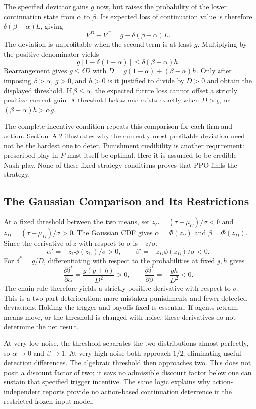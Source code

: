 \documentclass{article}
\begin{document}
The specified deviator gains $g$ now, but raises the probability of the lower continuation state from $\alpha$ to $\beta$. Its expected loss of continuation value is therefore $\delta(\beta-\alpha)L$, giving
\[
V^D-V^C=g-\delta(\beta-\alpha)L.
\]
The deviation is unprofitable when the second term is at least $g$. Multiplying by the positive denominator yields
\[
g[1-\delta(1-\alpha)]\le\delta(\beta-\alpha)h.
\]
Rearrangement gives $g\le\delta D$ with $D=g(1-\alpha)+(\beta-\alpha)h$. Only after imposing $\beta>\alpha$, $g>0$, and $h>0$ is it justified to divide by $D>0$ and obtain the displayed threshold. If $\beta\le\alpha$, the expected future loss cannot offset a strictly positive current gain. A threshold below one exists exactly when $D>g$, or $(\beta-\alpha)h>\alpha g$.

The complete incentive condition repeats this comparison for each firm and action. Section~A.2 illustrates why the currently most profitable deviation need not be the hardest one to deter. Punishment credibility is another requirement: prescribed play in $P$ must itself be optimal. Here it is assumed to be credible Nash play. None of these fixed-strategy conditions proves that PPO finds the strategy.

\subsection{The Gaussian Comparison and Its Restrictions}

At a fixed threshold between the two means, set $z_C=(\tau-\mu_C)/\sigma<0$ and $z_D=(\tau-\mu_D)/\sigma>0$. The Gaussian CDF gives $\alpha=\Phi(z_C)$ and $\beta=\Phi(z_D)$. Since the derivative of $z$ with respect to $\sigma$ is $-z/\sigma$,
\[
\alpha'=-z_C\phi(z_C)/\sigma>0,
\qquad \beta'=-z_D\phi(z_D)/\sigma<0.
\]
For $\delta^*=g/D$, differentiating with respect to the probabilities at fixed $g,h$ gives
\[
\frac{\partial\delta^*}{\partial\alpha}=\frac{g(g+h)}{D^2}>0,
\qquad
\frac{\partial\delta^*}{\partial\beta}=-\frac{gh}{D^2}<0.
\]
The chain rule therefore yields a strictly positive derivative with respect to $\sigma$. This is a two-part deterioration: more mistaken punishments and fewer detected deviations. Holding the trigger and payoffs fixed is essential. If agents retrain, means move, or the threshold is changed with noise, these derivatives do not determine the net result.

At very low noise, the threshold separates the two distributions almost perfectly, so $\alpha\to0$ and $\beta\to1$. At very high noise both approach $1/2$, eliminating useful detection differences. The algebraic threshold then approaches two. This does not posit a discount factor of two; it says no admissible discount factor below one can sustain that specified trigger incentive. The same logic explains why action-independent reports provide no action-based continuation deterrence in the restricted frozen-input model.
\end{document}
